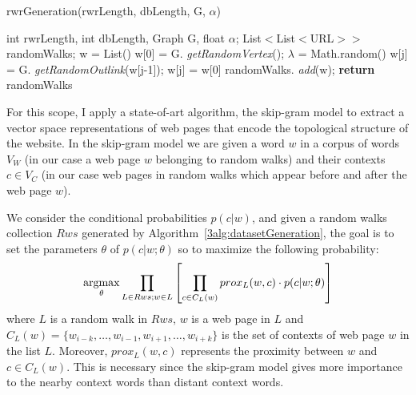 \begin{algorithm}[tb]
\caption{rwrGeneration(rwrLength, dbLength, G, $\alpha$)}
\label{3alg:datasetGeneration}
\begin{algorithmic}[1]
\renewcommand{\algorithmicrequire}{\textbf{Input:}}
\renewcommand{\algorithmicensure}{\textbf{Output:}}
\renewcommand{\algorithmiccomment}[1]{$//$ \textit{#1}}
\renewcommand{\algorithmicforall}{\textbf{for each}}
\newcommand{\getRandomVertex}[1]{ \textit{getRandomVertex}(#1); }
\newcommand{\getNextRandomVertex}[1]{ \textit{getRandomOutlink}(#1); }
\newcommand{\add}[1]{ \textit{add}(#1); }
\newcommand{\RETURN}[1]{\textbf{return} #1}

\REQUIRE int rwrLength, int dbLength, Graph G, float $\alpha$;
\ENSURE List$<$List$<$URL$>>$ randomWalks;
	    \STATE w = List()
	    \STATE w[0] = G.\getRandomVertex{}
		\STATE $\lambda$ = Math.random()
		\IF{$\lambda > \alpha$}
		\STATE w[j] = G.\getNextRandomVertex{w[j-1]}
		\ELSE 
		\STATE w[j] = w[0]
		\ENDIF
		\ENDFOR
		\STATE randomWalks.\add{w}
 	\ENDFOR
\RETURN randomWalks

\end{algorithmic}
\end{algorithm}
 

For this scope, I apply a state-of-art algorithm, the skip-gram model \cite{Mikolov:2013} to extract a vector space representations of web pages that encode the topological structure of the website. In the skip-gram model we are given a word $w$ in a corpus of words $V_W$ (in our case a web page $w$ belonging to random walks) and their contexts $c \in V_C$ (in our case web pages in random walks which appear before and after the web page $w$).


We consider the conditional probabilities $p(c|w)$, and given a random walks collection $Rws$ generated by Algorithm~\ref{3alg:datasetGeneration}, the goal is to set the parameters $\theta$ of $p(c|w; \theta)$ so to maximize the following probability:
\begin{equation} 
\operatornamewithlimits{argmax}_{\theta} \prod_{L \in Rws; w \in L}\left [\prod_{c \in C_L(w)} prox_L(w,c)\cdot p(c|w;\theta) \right ] 
\label{eq:opt}
\end{equation}
where $L$ is a random walk in $Rws$, $w$ is a web page in $L$ and $C_L(w) = \{w_{i-k}, \dots , w_{i-1}, w_{i+1}, \dots, w_{i+k}\}$ is the set of contexts of web page $w$ in the list $L$. 
Moreover,  $prox_L(w,c)$ represents the proximity between $w$ and $c \in C_L(w)$. This is necessary since the  skip-gram model gives more importance to the nearby context words than distant context words.

